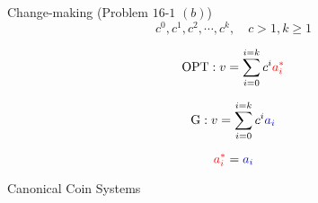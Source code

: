 \begin{frame}{}
  \begin{exampleblock}{Change-making (Problem $16$-$1$ $(b)$)}
    \[
      c^0, c^1, c^2, \cdots, c^k, \quad c > 1, k \ge 1
    \]
  \end{exampleblock}

  \pause
  \[
    \text{OPT}: v = \sum_{i=0}^{i=k} c^{i} \textcolor{red}{a^{\ast}_{i}}
  \]

  \pause
  \vspace{0.30cm}
  \[
    \text{G}: v = \sum_{i=0}^{i=k} c^{i} \textcolor{blue}{a_{i}}
  \]

  \pause
  \vspace{0.50cm}
  \[
    \textcolor{red}{a^{\ast}_{i}} = \textcolor{blue}{a_{i}}
  \]
\end{frame}

\begin{frame}{}
  \centerline{\Large Canonical Coin Systems}

  \vspace{0.30cm}
\end{frame}
